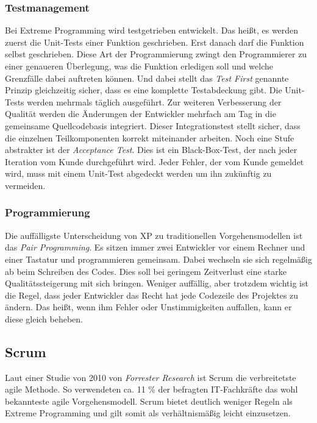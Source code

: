 \subsubsection{Testmanagement}
Bei Extreme Programming wird testgetrieben entwickelt. Das heißt, es werden zuerst die Unit-Tests einer Funktion geschrieben. Erst danach darf die Funktion selbst geschrieben. Diese Art der Programmierung zwingt den Programmierer zu einer genaueren Überlegung, was die Funktion erledigen soll und welche Grenzfälle dabei auftreten können. Und dabei stellt das \emph{Test First} genannte Prinzip gleichzeitig sicher, dass es eine komplette Testabdeckung gibt. Die Unit-Tests werden mehrmals täglich ausgeführt. Zur weiteren Verbesserung der Qualität werden die Änderungen der Entwickler mehrfach am Tag in die gemeinsame Quellcodebasis integriert. Dieser Integrationstest stellt sicher, dass die einzelnen Teilkomponenten korrekt miteinander arbeiten. Noch eine Stufe abstrakter ist der \emph{Acceptance Test}. Dies ist ein Black-Box-Test, der nach jeder Iteration vom Kunde durchgeführt wird. Jeder Fehler, der vom Kunde gemeldet wird, muss mit einem Unit-Test abgedeckt werden um ihn zukünftig zu vermeiden.

\subsubsection{Programmierung}
Die auffälligste Unterscheidung von XP zu traditionellen Vorgehensmodellen ist das \emph{Pair Programming}. Es sitzen immer zwei Entwickler vor einem Rechner und einer Tastatur und programmieren gemeinsam. Dabei wechseln sie sich regelmäßig ab beim Schreiben des Codes. Dies soll bei geringem Zeitverlust eine starke Qualitätssteigerung mit sich bringen. Weniger auffällig, aber trotzdem wichtig ist die Regel, dass jeder Entwickler das Recht hat jede Codezeile des Projektes zu ändern. Das heißt, wenn ihm Fehler oder Unstimmigkeiten auffallen, kann er diese gleich beheben. 

\subsection{Scrum}
\label{ch:scrum}
Laut einer Studie von 2010 von \emph{Forrester Research} ist Scrum die verbreitetste agile Methode. So verwendeten ca. 11 \% der befragten IT-Fach\-kräfte das wohl bekannteste agile Vorgehensmodell. \cite{bib:ane} Scrum bietet deutlich weniger Regeln als Extreme Programming und gilt somit als verhältnismäßig leicht einzusetzen. 

